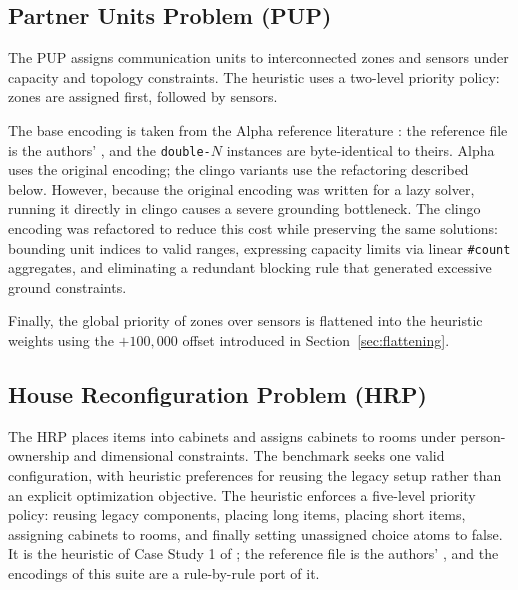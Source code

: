 \subsection{Partner Units Problem (PUP)}
\label{sec:pup-encoding}

The PUP \cite{aschinger2011pup} assigns communication units to interconnected zones and sensors under capacity and topology constraints. The heuristic uses a two-level priority policy: zones are assigned first, followed by sensors.

The base encoding is taken from the Alpha reference literature \cite{aschinger2011pup,comploi2023dynamicAggregates}: the reference file is the authors' , and the \texttt{double-$N$} instances are byte-identical to theirs. Alpha uses the original encoding; the clingo variants use the refactoring described below. However, because the original encoding was written for a lazy solver, running it directly in clingo causes a severe grounding bottleneck. The clingo encoding was refactored to reduce this cost while preserving the same solutions: bounding unit indices to valid ranges, expressing capacity limits via linear \texttt{\#count} aggregates, and eliminating a redundant blocking rule that generated excessive ground constraints.

Finally, the global priority of zones over sensors is flattened into the heuristic weights using the $+100{,}000$ offset introduced in Section~\ref{sec:flattening}.


\subsection{House Reconfiguration Problem (HRP)}
\label{sec:hrp-encoding}

The HRP \cite{friedrich2011reconfiguration} places items into cabinets and assigns cabinets to rooms under person-ownership and dimensional constraints. The benchmark seeks one valid configuration, with heuristic preferences for reusing the legacy setup rather than an explicit optimization objective. The heuristic enforces a five-level priority policy: reusing legacy components, placing long items, placing short items, assigning cabinets to rooms, and finally setting unassigned choice atoms to false. It is the heuristic of Case Study 1 of \cite{comploi2023domain}; the reference file is the authors' , and the encodings of this suite are a rule-by-rule port of it.


